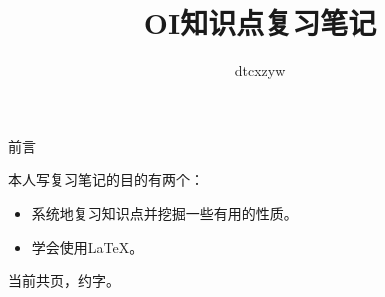 \documentclass[10pt,a16paper,UTF8,AutoFakeBold,AutoFakeSlant]{book}
\begin{document}
\newtheorem{theorem}{定理}[chapter]
\newtheorem{lemma}[theorem]{引理}
\newtheorem{property}{性质}[chapter]
\newtheorem{inference}[theorem]{推论}
\title{OI知识点复习笔记}
\author{dtcxzyw}
\maketitle
\frontmatter
\begin{center}
	\Huge 前言
\end{center}
本人写复习笔记的目的有两个：
\begin{itemize}
	\item 系统地复习知识点并挖掘一些有用的性质。
	\item 学会使用\LaTeX{}。
\end{itemize}
当前共\pageref{LastPage}页，约字。
\tableofcontents
\mainmatter{}




\appendix

\printindex

\end{document}
